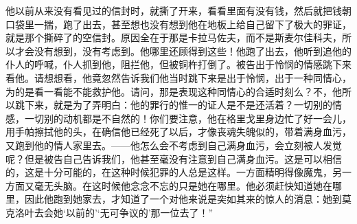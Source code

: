 他以前从来没有看见过的信封时，就撕了开来，看看里面有没有钱，然后就把钱朝口袋里一揣，跑了出去，甚至想也没有想到他在地板上给自己留下了极大的罪证，就是那个撕碎了的空信封。原因全在于那是卡拉马佐夫，而不是斯麦尔佳科夫，所以才会没有想到，没有考虑到。他哪里还顾得到这些！他跑了出去，他听到追他的仆人的呼喊，仆人抓到他，阻拦他，但被铜杵打倒了。被告出于怜悯的情感跳下来看他。请想想看，他竟忽然告诉我们他当时跳下来是出于怜悯，出于一种同情心，为的是看一看能不能救护他。请问，那是表现这种同情心的合适时刻么？不，他所以跳下来，就是为了弄明白：他的罪行的惟一的证人是不是还活着？一切别的情感，一切别的动机都是不自然的！你们要注意，他在格里戈里身边忙了好一会儿，用手帕擦拭他的头，在确信他已经死了以后，才像丧魂失魄似的，带着满身血污，又跑到他的情人家里去。——他怎么会不考虑到自己满身血污，会立刻被人发觉呢？但是被告自己告诉我们，他甚至毫没有注意到自己满身血污。这是可以相信的，这是十分可能的，在这种时候犯罪的人总是这样。一方面精明得像魔鬼，另一方面又毫无头脑。在这时候他念念不忘的只是她在哪里。他必须赶快知道她在哪里，因此他跑到她家去，才知道了一个对他来说是突如其来的惊人的消息：她到莫克洛叶去会她‘以前的’‘无可争议的’那一位去了！”
